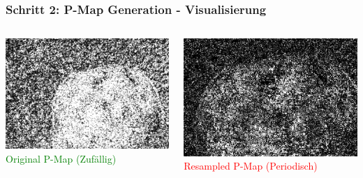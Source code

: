 \documentclass[11pt,t,usepdftitle=false,aspectratio=169]{beamer}
\begin{document}
\begin{frame}
	\frametitle{Schritt 2: P-Map Generation - Visualisierung}
	
	\begin{columns}[T]
		\begin{column}{0.48\textwidth}
			\includegraphics[width=\textwidth]{images/examples_unedited/p_map_zoom.png}
			\textcolor{green}{\small Original P-Map (Zufällig)}
		\end{column}
		\begin{column}{0.48\textwidth}
			\includegraphics[width=\textwidth]{images/examples_edited/p_map_zoom.png}
			\textcolor{red}{\small Resampled P-Map (Periodisch)}
		\end{column}
	\end{columns}
\end{frame}
\end{document}
